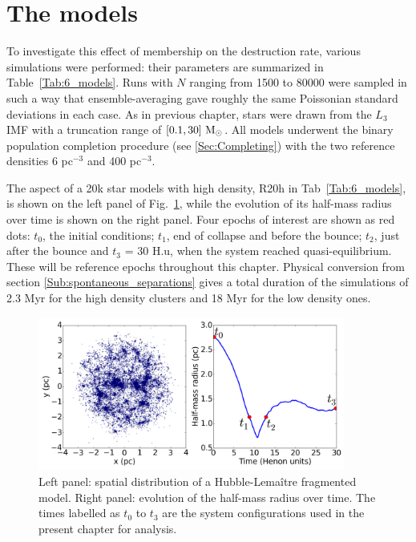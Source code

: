 \section{The models}
\label{Sec:6_models}

To investigate this effect of membership on the destruction rate, various simulations were performed: their parameters are summarized in Table~\ref{Tab:6_models}. Runs with $N$ ranging from 1500 to 80000 were sampled in such a way that ensemble-averaging  gave roughly the same Poissonian standard deviations in each case. As in previous chapter, stars were drawn from the $L_3$ IMF \citep{Maschberger2013} with a truncation range of $[0.1,30]~{\textrm{M}_\odot}$. All models underwent the binary population completion procedure (see \ref{Sec:Completing}) with the two reference densities 6 pc$^{-3}$ and 400 pc$^{-3}$.

The aspect of a 20k star models with high density, R20h in Tab~\ref{Tab:6_models}, is shown on the left panel of Fig.~\ref{Fig:6_Rhm}, while the evolution of its half-mass radius over time is shown on the right panel. Four epochs of interest are shown as red dots: $t_0$, the initial conditions; $t_1$, end of collapse and before the bounce; $t_2$, just after the bounce and $t_3$ = 30 H.u, when the system reached quasi-equilibrium. These will be reference epochs throughout this chapter. Physical conversion from section \ref{Sub:spontaneous_separations} gives a total duration of the simulations of 2.3 Myr for the high density clusters and 18 Myr for the low density ones.


\begin{figure}
\begin{center}
\includegraphics[width=0.9\textwidth]{Figures/6_Rhm}
\caption[Aspect of the HL model and reference epochs]{Left panel: spatial distribution of a Hubble-Lema\^itre fragmented model. Right panel: evolution of the half-mass radius over time. The times labelled as $t_0$ to $t_3$ are the system configurations used in the present chapter for analysis. }
\label{Fig:6_Rhm}
\end{center}
\end{figure}


